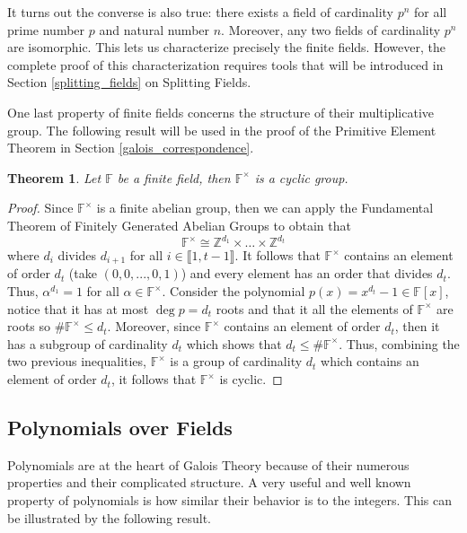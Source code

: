\documentclass{article}
\theoremstyle{plain}
\newtheorem{theorem}{Theorem}[subsection]
\theoremstyle{definition}
\newcommand{\Z}{\mathbb{Z}}
\newcommand{\F}{\mathbb{F}}
\newcommand{\Iint}[2]{\llbracket #1 , #2 \rrbracket}
\newcommand{\isomorphic}{\cong}
\begin{document}
It turns out the converse is also true: there exists a field of cardinality $p^n$ for all prime number $p$ and natural number $n$. Moreover, any two fields of cardinality $p^n$ are isomorphic. This lets us characterize precisely the finite fields. However, the complete proof of this characterization requires tools that will be introduced in Section \ref{splitting_fields} on Splitting Fields.

One last property of finite fields concerns the structure of their multiplicative group. The following result will be used in the proof of the Primitive Element Theorem in Section \ref{galois_correspondence}.

\begin{theorem}
\label{multiplicative group is cyclic}
    Let $\F$ be a finite field, then $\F^{\times}$ is a cyclic group.
\end{theorem}

\begin{proof}
    Since $\F^{\times}$ is a finite abelian group, then we can apply the Fundamental Theorem of Finitely Generated Abelian Groups to obtain that
    $$\F^{\times} \isomorphic \Z^{d_1} \times \dots \times \Z^{d_t}$$
    where $d_i$ divides $d_{i+1}$ for all $i \in \Iint{1}{t-1}$. It follows that $\F^{\times}$ contains an element of order $d_t$ (take $(0,0, ..., 0, 1)$) and every element has an order that divides $d_t$. Thus, $\alpha^{d_1} = 1$ for all $\alpha \in \F^{\times}$. Consider the polynomial $p(x) = x^{d_t} - 1 \in \F[x]$, notice that it has at most $\deg p = d_t$ roots and that it all the elements of $\F^{\times}$ are roots so $\# \F^{\times} \leq d_t$. Moreover, since $\F^{\times}$ contains an element of order $d_t$, then it has a subgroup of cardinality $d_t$ which shows that $d_t \leq \# \F^{\times}$. Thus, combining the two previous inequalities, $\F^{\times}$ is a group of cardinality $d_t$ which contains an element of order $d_t$, it follows that $\F^{\times}$ is cyclic.
\end{proof}

\subsection{Polynomials over Fields}

Polynomials are at the heart of Galois Theory because of their numerous properties and their complicated structure. A very useful and well known property of polynomials is how similar their behavior is to the integers. This can be illustrated by the following result. 
\end{document}
